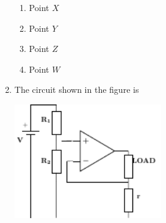 \documentclass[journal,12pt,onecolumn]{IEEEtran}
\theoremstyle{remark}
\begin{document}
\begin{enumerate}
\begin{enumerate}
    \item Point $X$
     \item Point $Y$
      \item Point $Z$
       \item Point $W$\\
\end{enumerate}
\item The circuit shown in the figure is
 \begin{center}
\includegraphics[width=0.5\textwidth]{figs/fig7/main} %
\end{center}


\end{enumerate}
\end{document}
